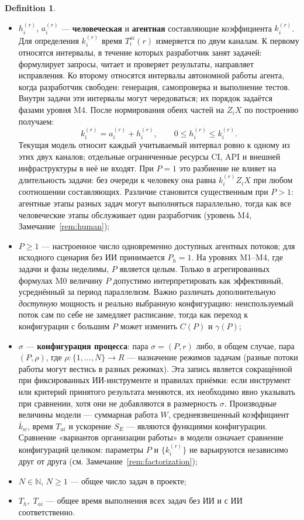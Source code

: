 \documentclass[12pt,a4paper]{article}
\theoremstyle{definition}
\newtheorem{definition}{Definition}
\begin{document}
\begin{definition}
\begin{itemize}
  \item $h_i^{(r)},\, a_i^{(r)}$ --- \textbf{человеческая} и \textbf{агентная} составляющие коэффициента $k_i^{(r)}$. Для определения $k_i^{(r)}$ время $T_i^{ai}(r)$ измеряется по двум каналам. К первому относятся интервалы, в течение которых разработчик занят задачей: формулирует запросы, читает и проверяет результаты, направляет исправления. Ко второму относятся интервалы автономной работы агента, когда разработчик свободен: генерация, самопроверка и выполнение тестов. Внутри задачи эти интервалы могут чередоваться; их порядок задаётся фазами уровня M4. После нормирования обеих частей на $Z_i X$ по построению получаем:
  \[
    k_i^{(r)} = a_i^{(r)} + h_i^{(r)}, \qquad 0 \le h_i^{(r)} \le k_i^{(r)}.
  \]
  Текущая модель относит каждый учитываемый интервал ровно к одному из этих двух каналов; отдельные ограниченные ресурсы CI, API и внешней инфраструктуры в неё не входят. При $P = 1$ это разбиение не влияет на длительность задачи: без очереди к человеку она равна $k_i^{(r)} Z_i X$ при любом соотношении составляющих. Различие становится существенным при $P > 1$: агентные этапы разных задач могут выполняться параллельно, тогда как все человеческие этапы обслуживает один разработчик (уровень M4, Замечание~\ref{rem:human});
  \item $P \ge 1$ --- настроенное число одновременно доступных агентных потоков; для исходного сценария без ИИ принимается $P_h = 1$. На уровнях M1--M4, где задачи и фазы неделимы, $P$ является целым. Только в агрегированных формулах M0 величину $P$ допустимо интерпретировать как эффективный, усреднённый за период параллелизм. Важно различать дополнительную \emph{доступную} мощность и реально выбранную конфигурацию: неиспользуемый поток сам по себе не замедляет расписание, тогда как переход к конфигурации с большим $P$ может изменить $C(P)$ и $\gamma(P)$;
  \item $\sigma$ --- \textbf{конфигурация процесса}: пара $\sigma = (P, r)$ либо, в общем случае, пара $(P, \rho)$, где $\rho\colon \{1, \dots, N\} \to R$ --- назначение режимов задачам (разные потоки работы могут вестись в разных режимах). Эта запись является сокращённой при фиксированных ИИ-инструменте и правилах приёмки: если инструмент или критерий принятого результата меняются, их необходимо явно указывать при сравнении, хотя они не добавляются в размерность $\sigma$. Производные величины модели --- суммарная работа $W$, средневзвешенный коэффициент $\bar{k}_w$, время $T_{ai}$ и ускорение $S_E$ --- являются функциями конфигурации. Сравнение «вариантов организации работы» в модели означает сравнение конфигураций целиком: параметры $P$ и $\{k_i^{(r)}\}$ не варьируются независимо друг от друга (см. Замечание~\ref{rem:factorization});
  \item $N \in \mathbb{N}$, $N\ge1$ --- общее число задач в проекте;
  \item $T_h,\; T_{ai}$ --- общее время выполнения всех задач без ИИ и с ИИ соответственно.
\end{itemize}
\end{definition}
\end{document}
